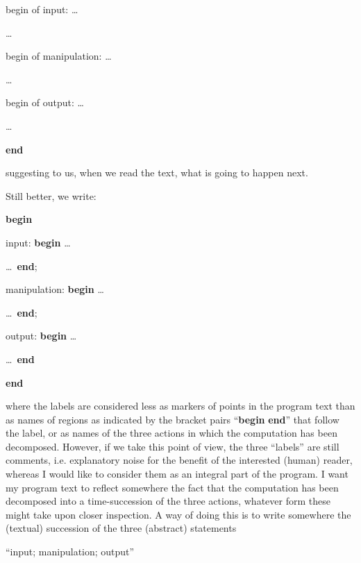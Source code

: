 \noindent
begin of input:\tabto{10em} \quad\dots
\nopagebreak

\noindent
\tabto{10em} \quad\dots

\noindent
begin of manipulation:\tabto{10em} \quad\dots
\nopagebreak

\noindent
\tabto{10em} \quad\dots

\noindent
begin of output:\tabto{10em} \quad\dots
\nopagebreak

\noindent
\tabto{10em} \quad\dots

\noindent
\tabto{10em}\textbf{end}

\noindent
suggesting to us, when we read the text, what is going to happen next.

Still better, we write:

\noindent
\tabto{10em}\textbf{begin}
\nopagebreak

\noindent
input:\tabto{10em} \quad\textbf{begin} \tabto{14em}\dots
\nopagebreak

\noindent
\tabto{13em} \quad\dots\ \textbf{end};

\noindent
manipulation:\tabto{10em} \quad\textbf{begin} \tabto{14em}\dots
\nopagebreak

\noindent
\tabto{13em} \quad\dots\ \textbf{end};

\noindent
output:\tabto{10em} \quad\textbf{begin} \tabto{14em}\dots
\nopagebreak
\nopagebreak

\noindent
\tabto{13em} \quad\dots\ \textbf{end}
\nopagebreak

\noindent
\tabto{10em}\textbf{end}

\noindent
where the labels are considered less as markers of points in the program text than as names of regions \textemdash{}  as indicated by the bracket pairs ``\textbf{begin} \textendash  \textbf{end}'' \textemdash{}  that follow the label, or as names of the three actions in which the computation has been decomposed. However, if we take this point of view, the three ``labels'' are still comments, i.e. explanatory noise for the benefit of the interested (human) reader, whereas I would like to consider them as an integral part of the program. I want my program text to reflect somewhere the fact that the computation has been decomposed into a time-succession of the three actions, whatever form these might take upon closer inspection. A way of doing this is to write somewhere the (textual) succession of the three (abstract) statements
\medskip

{
	\setlength{\parindent}{8em}
	\hspace{-.4em}``input; manipulation; output''
}
\medskip


